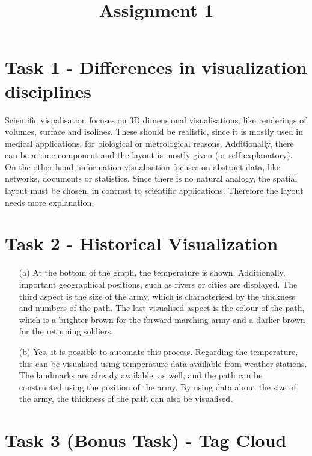 \documentclass[a4paper]{article}
\date{}
\author{}
\title{Assignment 1}
\begin{document}
	\maketitle 
	\thispagestyle{fancy}
	
	\section*{Task 1 - Differences in visualization disciplines}
	
	Scientific visualisation focuses on 3D dimensional visualisations, like renderings of volumes, surface and isolines. 
	These should be realistic, since it is mostly used in medical applications, for biological or metrological reasons. 
	Additionally, there can be a time component and the layout is mostly given (or self explanatory).\\ \linebreak
	On the other hand, information visualisation focuses on abstract data, like networks, documents or statistics. 
	Since there is no natural analogy, the spatial layout must be chosen, in contrast to scientific applications. 
	Therefore the layout needs more explanation. 
	
	
	\section*{Task 2 - Historical Visualization}
	
	\begin{enumerate}
		\item[(a)] At the bottom of the graph, the temperature is shown. 
		Additionally, important geographical positions, such as rivers or cities are displayed. 
		The third aspect is the size of the army, which is characterised by the thickness and numbers of the path. 
		The last  visualised aspect is the colour of the path, which is a brighter brown for the forward marching army and a darker brown for the returning soldiers. 
		\item[(b)] Yes, it is possible to automate this process. 
		Regarding the temperature, this can be visualised using temperature data available from weather stations.
		The landmarks are already available, as well, and the path can be constructed using the position of the army. 
		By using data about the size of the army, the thickness of the path can also be visualised. 
	\end{enumerate}
	
	\section*{Task 3 (Bonus Task) - Tag Cloud}
\end{document}
